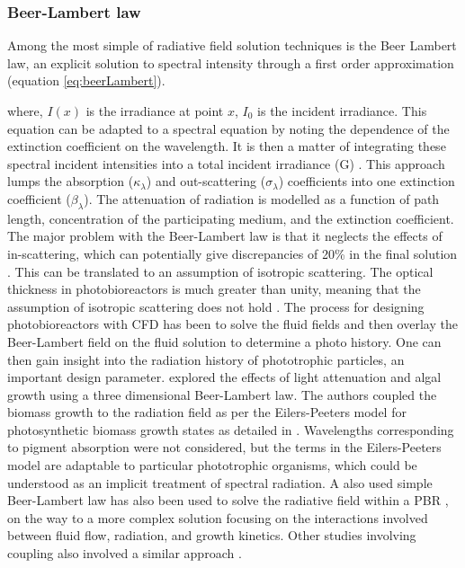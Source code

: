 \subsubsection{Beer-Lambert law}
\label{S:2.3.1}
Among the most simple of radiative field solution techniques is the Beer Lambert law, an explicit solution to spectral intensity through a first order approximation (equation \ref{eq:beerLambert}). 


where, $I(x)$ is the irradiance at point $x$, $I_0$ is the incident irradiance. This equation can be adapted to a spectral equation by noting the dependence of the extinction coefficient on the wavelength. It is then a matter of integrating these spectral incident intensities into a total incident irradiance (G) \cite{pottier2005}.
\skippingparagraph
This approach lumps the absorption ($\kappa_\lambda$) and out-scattering ($\sigma_\lambda$) coefficients into one extinction coefficient ($\beta_\lambda$). The attenuation of radiation is modelled as a function of path length, concentration of the participating medium, and the extinction coefficient. The major problem with the Beer-Lambert law is that it neglects the effects of in-scattering, which can potentially give discrepancies of 20\% in the final solution \cite{berberoglu2007,pottier2005,wang2014a}. This can be translated to an assumption of isotropic scattering. The optical thickness in photobioreactors is much greater than unity, meaning that the assumption of isotropic scattering does not hold \cite{modest2003}.
\skippingparagraph
The process for designing photobioreactors with CFD has been to solve the fluid fields and then overlay the Beer-Lambert field on the fluid solution to determine a photo history. One can then gain insight into the radiation history of phototrophic particles, an important design parameter. \cite{marshall2010} explored the effects of light attenuation and algal growth using a three dimensional Beer-Lambert law. The authors coupled the biomass growth to the radiation field as per the Eilers-Peeters model for photosynthetic biomass growth states as detailed in \cite{bechet2013}. Wavelengths corresponding to pigment absorption were not considered, but the terms in the Eilers-Peeters model are adaptable to particular phototrophic organisms, which could be understood as an implicit treatment of spectral radiation. A  also used simple Beer-Lambert law has also been used to solve the radiative field within a PBR \cite{nauha2013}, on the way to a more complex solution focusing on the interactions involved between fluid flow, radiation, and growth kinetics. Other studies involving coupling also involved a similar approach \cite{marshall2011}. 
